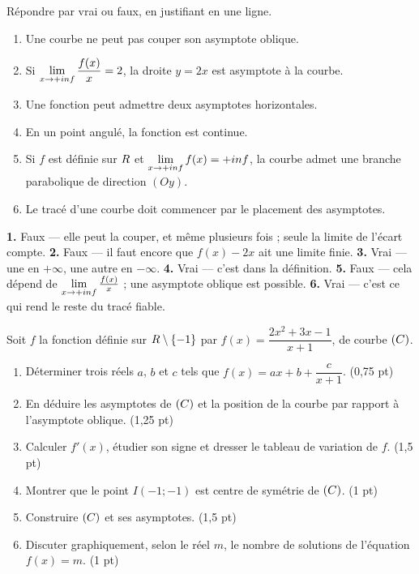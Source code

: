 \begin{jemeteste}
Répondre par vrai ou faux, en justifiant en une ligne.

\begin{enumerate}[label=\textbf{\arabic*.}, leftmargin=*, itemsep=0.28em]
  \item Une courbe ne peut pas couper son asymptote oblique.
  \item Si $\limpinf \dfrac{f(x)}{x} = 2$, la droite $y = 2x$ est asymptote à
        la courbe.
  \item Une fonction peut admettre deux asymptotes horizontales.
  \item En un point angulé, la fonction est continue.
  \item Si $f$ est définie sur $R$ et $\limpinf f(x) = +\infty$, la courbe
        admet une branche parabolique de direction $(Oy)$.
  \item Le tracé d'une courbe doit commencer par le placement des asymptotes.
\end{enumerate}
\end{jemeteste}

\begin{corrige}[je me teste]
\textbf{1.} Faux — elle peut la couper, et même plusieurs fois ; seule la
limite de l'écart compte.
\textbf{2.} Faux — il faut encore que $f(x)-2x$ ait une limite finie.
\textbf{3.} Vrai — une en $+\infty$, une autre en $-\infty$.
\textbf{4.} Vrai — c'est dans la définition.
\textbf{5.} Faux — cela dépend de $\limpinf \frac{f(x)}{x}$ ; une asymptote
oblique est possible.
\textbf{6.} Vrai — c'est ce qui rend le reste du tracé fiable.
\end{corrige}

\begin{commeaubac}
Soit $f$ la fonction définie sur $R \setminus \{-1\}$ par
$f(x) = \dfrac{2x^{2}+3x-1}{x+1}$, de courbe $(C)$.

\begin{enumerate}[label=\textbf{\arabic*.}, leftmargin=*, itemsep=0.25em]
  \item Déterminer trois réels $a$, $b$ et $c$ tels que
        $f(x) = ax+b+\dfrac{c}{x+1}$. \hfill\textup{(0,75 pt)}
  \item En déduire les asymptotes de $(C)$ et la position de la courbe par
        rapport à l'asymptote oblique. \hfill\textup{(1,25 pt)}
  \item Calculer $f'(x)$, étudier son signe et dresser le tableau de variation
        de $f$. \hfill\textup{(1,5 pt)}
  \item Montrer que le point $I(-1;-1)$ est centre de symétrie de $(C)$.
        \hfill\textup{(1 pt)}
  \item Construire $(C)$ et ses asymptotes. \hfill\textup{(1,5 pt)}
  \item Discuter graphiquement, selon le réel $m$, le nombre de solutions de
        l'équation $f(x) = m$. \hfill\textup{(1 pt)}
\end{enumerate}
\end{commeaubac}

